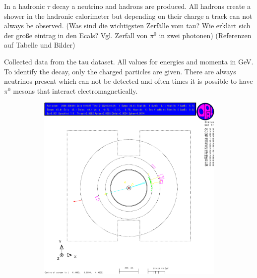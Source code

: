 \documentclass[11pt, a4paper]{article}
\numberwithin{equation}{section}
\newcommand{\korr}[1]{{\color{red}(#1)}}
\begin{document}
In a hadronic $\tau$ decay a neutrino and hadrons are produced.
All hadrons create a shower in the hadronic calorimeter but depending on their charge a track can not always be observed.
\korr{Was sind die wichtigsten Zerfälle vom tau? Wie erklärt sich der große eintrag in den Ecals? Vgl. Zerfall von $\pi^0$ in zwei photonen}
\korr{Referenzen auf Tabelle und Bilder}
\begin{table}
	\centering
	\resizebox{\textwidth}{!}{
		
	}
	\caption{Collected data from the tau dataset. All values for energies and momenta in \si{GeV}. To identify the decay, only the charged particles are given. There are always neutrinos present which can not be detected and often times it is possible to have $\pi^0$ mesons that interact electromagnetically.}
\end{table}
\begin{figure}[h]
	\centering
	\begin{subfigure}{\textwidth}
		\centering
		\includegraphics[width=.9\textwidth]{./data/tag1/tt_pics/cropped/tt_05}
	\end{subfigure}
\end{figure}
\end{document}
